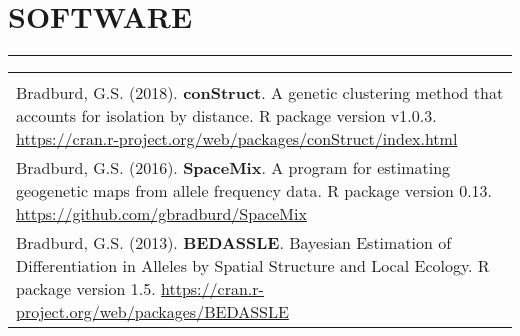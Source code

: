\documentclass{article}
\begin{document}
\section*{SOFTWARE}
\vspace{-0.6cm}
\rule{470pt}{0.4pt}
\begin{tabular}{>{\everypar{\hangindent1cm}}p{}}
\hfill\\
%
Bradburd, G.S. (2018). \textbf{conStruct}. A genetic clustering method that accounts for isolation by distance. R package version v1.0.3.
\href{https://cran.r-project.org/web/packages/conStruct/index.html}{https://cran.r-project.org/web/packages/conStruct/index.html}\\
%
\vspace{-0.1cm}
%
Bradburd, G.S. (2016). \textbf{SpaceMix}. A program for estimating geogenetic maps from allele frequency data. R package version 0.13.
\href{https://github.com/gbradburd/SpaceMix}{https://github.com/gbradburd/SpaceMix}\\
%
\vspace{-0.1cm}
%
Bradburd, G.S. (2013). \textbf{BEDASSLE}. Bayesian Estimation of Differentiation in Alleles by Spatial Structure and Local Ecology. 
R package version 1.5. \href{https://cran.r-project.org/web/packages/BEDASSLE}{https://cran.r-project.org/web/packages/BEDASSLE}\\
%
\end{tabular}
%
\end{document}
